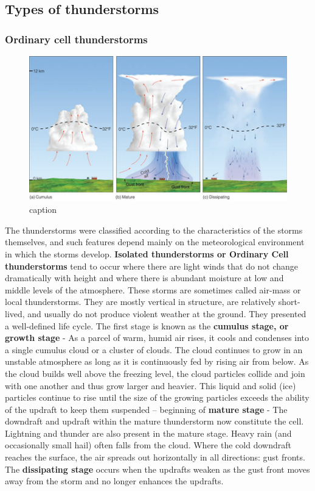 \documentclass[12pt,oneside]{book}
\begin{document}
\subsection{Types of thunderstorms}\label{types-of-thunderstorms}

\subsubsection{Ordinary cell
thunderstorms}\label{ordinary-cell-thunderstorms}

\begin{figure}

{\centering \includegraphics[width=0.8\linewidth]{figures/FigureE2} 

}

\caption{caption}\label{fig:Ordinarycellthunderstorms}
\end{figure}

The thunderstorms were classified according to the characteristics of
the storms themselves, and such features depend mainly on the
meteorological environment in which the storms develop. \textbf{Isolated
thunderstorms or Ordinary Cell thunderstorms} tend to occur where there
are light winds that do not change dramatically with height and where
there is abundant moisture at low and middle levels of the atmosphere.
These storms are sometimes called air-mass or local thunderstorms. They
are mostly vertical in structure, are relatively short-lived, and
usually do not produce violent weather at the ground. They presented a
well-defined life cycle. The first stage is known as the \textbf{cumulus
stage, or growth stage} - As a parcel of warm, humid air rises, it cools
and condenses into a single cumulus cloud or a cluster of clouds. The
cloud continues to grow in an unstable atmosphere as long as it is
continuously fed by rising air from below. As the cloud builds well
above the freezing level, the cloud particles collide and join with one
another and thus grow larger and heavier. This liquid and solid (ice)
particles continue to rise until the size of the growing particles
exceeds the ability of the updraft to keep them suspended -- beginning
of \textbf{mature stage} - The downdraft and updraft within the mature
thunderstorm now constitute the cell. Lightning and thunder are also
present in the mature stage. Heavy rain (and occasionally small hail)
often falls from the cloud. Where the cold downdraft reaches the
surface, the air spreads out horizontally in all directions: gust
fronts. The \textbf{dissipating stage} occurs when the updrafts weaken
as the gust front moves away from the storm and no longer enhances the
updrafts.
\end{document}
